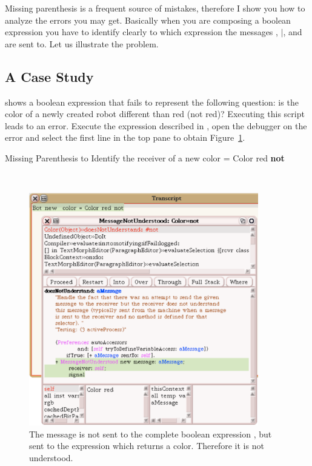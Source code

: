 Missing parenthesis is a frequent source of mistakes, therefore I show you how to analyze the errors you may get. Basically when you are composing a boolean expression you have to identify clearly to which expression the messages , \texttt{$\mid$}, and \ct{\&} are sent to. Let us illustrate the problem.

\subsection*{A Case Study}
 shows a boolean expression that fails to represent the following question: is the color of a newly created robot different than red (not red)?
Executing this script leads to an error. Execute the expression described in , open the debugger on the error and select the first line in the top pane to obtain Figure~\ref{fig:wrongnotparenthesis}. 

\begin{scriptwithtitle}{Missing Parenthesis to Identify the receiver  of a }\label{scr:wrongnotparenthesis}
\Turtle new  color = Color red \textbf{not}
\end{scriptwithtitle}
\


\begin{figure}
\begin{center}
\includegraphics[width=10cm]{colorRedNotDebug}
\caption{The message  is not sent to the complete boolean expression , but sent to the expression  which returns a color. Therefore it is not understood.\label{fig:wrongnotparenthesis}}
\end{center}
\end{figure}

